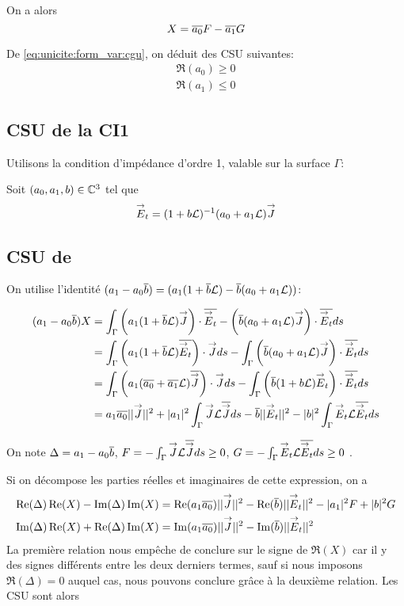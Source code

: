     On a alors
    \begin{equation*}
      X = \conj{a_0}F - \conj{a_1}G
    \end{equation*}

    De \eqref{eq:unicite:form_var:cgu}, on déduit des CSU suivantes:
    \begin{align}
      \Re\left(a_0\right) \ge 0\\
      \Re\left(a_1\right) \le 0
    \end{align}
  \subsection{CSU de la CI1}

    Utilisons la condition d’impédance d'ordre 1, valable sur la surface \(\Gamma\):

    Soit \((a_0, a_1,b) \in \CC^3\) tel que
    \[
      \vE_t = (1 + b \LL)^{-1} (a_0 + a_1 \LL) \vJ
    \]

    \subsection{CSU de \cite{stupfel_sufficient_2011}}

      On utilise l'identité \((a_1-a_0\conj{b}) = (a_1(1+\conj{b}\LL) - \conj{b}(a_0+a_1\LL))\):

      \begin{align*}
        (a_1-a_0\conj{b})X &= \int_\Gamma \left(a_1(1+\conj{b}\LL) \vJ\right)\cdot\conj{\vE_t} - \left(\conj{b}(a_0+a_1 \LL)\vJ\right)\cdot\conj{\vE_t} ds\\
        &= \int_\Gamma \left(a_1(1+\conj{b}\LL) \conj{\vE_t}\right)\cdot\vJ ds - \int_\Gamma \left(\conj{b}(a_0+a_1 \LL)\vJ\right)\cdot\conj{\vE_t} ds\\
        &= \int_\Gamma \left(a_1(\conj{a_0}+\conj{a_1}\LL) \conj{\vJ}\right)\cdot\vJ ds  - \int_\Gamma \left(\conj{b}(1+b \LL)\vE_t\right)\cdot\conj{\vE_t} ds\\
        &= a_1\conj{a_0} ||\vJ||^2 + |a_1|^2 \int_\Gamma \vJ \LL \conj{\vJ} ds - \conj{b} ||\vE_t||^2 - |b|^2 \int_\Gamma \vE_t \LL \conj{\vE_t} ds
      \end{align*}

      On note \(\Delta = a_1 -a_0\conj{b}\), \(F = -\int_\Gamma \vJ \LL \conj{\vJ} ds \ge 0 \), \(G = -\int_\Gamma \vE_t \LL \conj{\vE_t} ds \ge 0 \) .

      Si on décompose les parties réelles et imaginaires de cette expression, on a
      \begin{align*}
        \Re(\Delta)\Re(X) - \Im(\Delta)\Im(X) &= \Re(a_1\conj{a_0}) ||\vJ||^2 - \Re(\conj{b})||\vE_t||^2 -|a_1|^2 F + |b|^2 G \\
        \Im(\Delta)\Re(X) + \Re(\Delta)\Im(X) &= \Im(a_1\conj{a_0}) ||\vJ||^2 - \Im(\conj{b})||\vE_t||^2
      \end{align*}
      La première relation nous empêche de conclure sur le signe de \(\Re(X)\) car il y des signes différents entre les deux derniers termes, sauf si nous imposons \(\Re( \Delta)= 0\) auquel cas, nous pouvons conclure grâce à la deuxième relation. Les CSU sont alors

